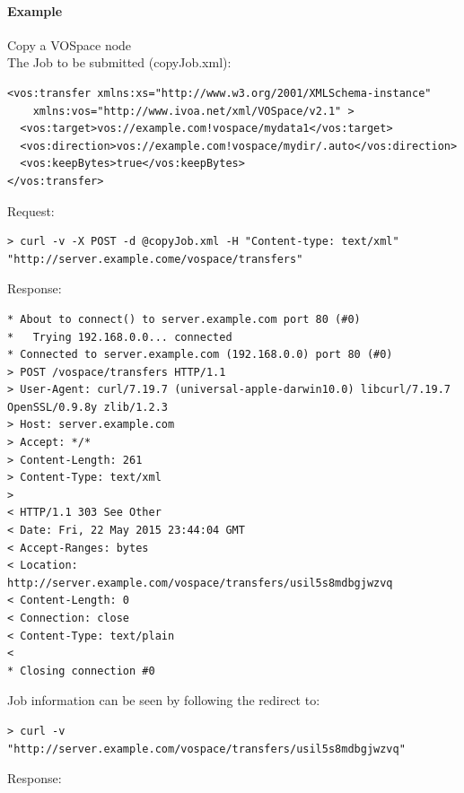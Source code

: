 \documentclass[11pt,a4paper]{ivoa}
\begin{document}
\paragraph{Example}
Copy a VOSpace node
\\[5px]
\noindent
The Job to be submitted (copyJob.xml):
\begin{lstlisting}
<vos:transfer xmlns:xs="http://www.w3.org/2001/XMLSchema-instance"
    xmlns:vos="http://www.ivoa.net/xml/VOSpace/v2.1" >
  <vos:target>vos://example.com!vospace/mydata1</vos:target>
  <vos:direction>vos://example.com!vospace/mydir/.auto</vos:direction>
  <vos:keepBytes>true</vos:keepBytes>
</vos:transfer>
\end{lstlisting}
Request:
\begin{lstlisting}
> curl -v -X POST -d @copyJob.xml -H "Content-type: text/xml" "http://server.example.come/vospace/transfers"
\end{lstlisting}
Response:
\begin{lstlisting}
* About to connect() to server.example.com port 80 (#0)
*   Trying 192.168.0.0... connected
* Connected to server.example.com (192.168.0.0) port 80 (#0)
> POST /vospace/transfers HTTP/1.1
> User-Agent: curl/7.19.7 (universal-apple-darwin10.0) libcurl/7.19.7 OpenSSL/0.9.8y zlib/1.2.3
> Host: server.example.com
> Accept: */*
> Content-Length: 261
> Content-Type: text/xml
>
< HTTP/1.1 303 See Other
< Date: Fri, 22 May 2015 23:44:04 GMT
< Accept-Ranges: bytes
< Location: http://server.example.com/vospace/transfers/usil5s8mdbgjwzvq
< Content-Length: 0
< Connection: close
< Content-Type: text/plain
<
* Closing connection #0
\end{lstlisting}
Job information can be seen by following the redirect to:
\begin{lstlisting}
> curl -v "http://server.example.com/vospace/transfers/usil5s8mdbgjwzvq"
\end{lstlisting}
Response:
\end{document}
